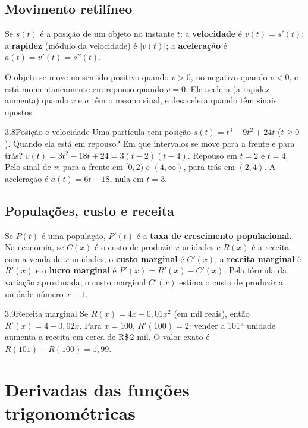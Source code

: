 \subsection{Movimento retilíneo}

\begin{definicao}
Se $s(t)$ é a posição de um objeto no instante $t$: a \textbf{velocidade} é
$v(t)=s'(t)$; a \textbf{rapidez} (módulo da velocidade) é $|v(t)|$; a
\textbf{aceleração} é $a(t)=v'(t)=s''(t)$.
\end{definicao}

O objeto se move no sentido positivo quando $v>0$, no negativo quando $v<0$, e está
momentaneamente em repouso quando $v=0$. Ele acelera (a rapidez aumenta) quando $v$ e $a$
têm o mesmo sinal, e desacelera quando têm sinais opostos.

\begin{exemplo}{3.8}{Posição e velocidade}
Uma partícula tem posição $s(t)=t^3-9t^2+24t$ ($t\ge0$). Quando ela está em repouso? Em
que intervalos se move para a frente e para trás?
\solucao
$v(t)=3t^2-18t+24=3(t-2)(t-4)$. Repouso em $t=2$ e $t=4$. Pelo sinal de $v$: para a frente
em $[0,2)$ e $(4,\infty)$, para trás em $(2,4)$. A aceleração é $a(t)=6t-18$, nula em $t=3$.
\end{exemplo}

\subsection{Populações, custo e receita}

Se $P(t)$ é uma população, $P'(t)$ é a \textbf{taxa de crescimento populacional}. Na
economia, se $C(x)$ é o custo de produzir $x$ unidades e $R(x)$ é a receita com a venda de
$x$ unidades, o \textbf{custo marginal} é $C'(x)$, a \textbf{receita marginal} é $R'(x)$
e o \textbf{lucro marginal} é $P'(x)=R'(x)-C'(x)$. Pela fórmula da variação aproximada, o
custo marginal $C'(x)$ estima o custo de produzir a unidade número $x+1$.

\begin{exemplo}{3.9}{Receita marginal}
Se $R(x)=4x-0{,}01x^2$ (em mil reais), então $R'(x)=4-0{,}02x$. Para $x=100$, $R'(100)=2$:
vender a 101ª unidade aumenta a receita em cerca de R\$\,2 mil. O valor exato é
$R(101)-R(100)=1{,}99$.
\end{exemplo}

\section{Derivadas das funções trigonométricas}

